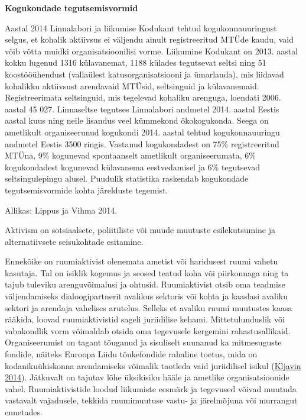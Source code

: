\documentclass[estonian,]{article}
\begin{document}
\begin{casebox}
\textbf{Kogukondade tegutsemisvormid}

Aastal 2014 Linnalabori ja liikumise Kodukant tehtud kogukonnauuringust
selgus, et kohalik aktiivsus ei väljendu ainult registreeritud MTÜde
kaudu, vaid võib võtta muidki organisatsioonilisi vorme. Liikumine
Kodukant on 2013. aastal kokku lugenud 1316 külavanemat, 1188 külades
tegutsevat seltsi ning 51 koostööühendust (vallaülest
katusorganisatsiooni ja ümarlauda), mis liidavad kohalikku aktiivsust
arendavaid MTÜsid, seltsinguid ja külavanemaid. Registreerimata
seltsinguid, mis tegelevad kohaliku arenguga, loendati 2006. aastal 45
027. Linnaseltse tegutses Linnalabori andmetel 2014. aastal Eestis
aastal kuus ning neile lisandus veel kümmekond ökokogukonda. Seega on
ametlikult organiseerunud kogukondi 2014. aastal tehtud kogukonnauuringu
andmetel Eestis 3500 ringis. Vastanud kogukondadest on 75\%
registreeritud MTÜna, 9\% kogunevad spontaanselt ametlikult
organiseerumata, 6\% kogukondadest kogunevad külavanema eestvedamisel ja
6\% tegutsevad seltsingulepingu alusel. Puudulik statistika raskendab
kogukondade tegutsemisvormide kohta järelduste tegemist.
\end{casebox}
\begin{imgsource}
{Allikas:} Lippus ja Vihma 2014.
\end{imgsource}

\begin{blockquote-right}
Aktivism on sotsiaalsete, poliitiliste või muude muutuste esilekutsumine
ja alternatiivsete seisukohtade esitamine.
\end{blockquote-right}

Ennekõike on ruumiaktivist olenemata ametist või haridusest ruumi vahetu kasutaja. Tal on isiklik kogemus ja seosed teatud koha või piirkonnaga ning ta tajub tuleviku arenguvõimalusi ja ohtusid. Ruumiaktivist otsib oma teadmise väljendamiseks dialoogipartnerit avalikus sektoris või kohta ja kaaslasi avaliku sektori ja arendaja vahelises arutelus. Selleks et avaliku ruumi muutustes kaasa rääkida, loovad ruumiaktivistid sageli juriidilise kehami. Mittetulunduslik või vabakondlik vorm võimaldab otsida oma tegevusele kergemini rahastusallikaid. Organiseerumist on tagant tõuganud ja sisuliselt suunanud ka mitmesuguste fondide, näiteks Euroopa Liidu tõukefondide rahaline toetus, mida on kodanikuühiskonna arendamiseks võimalik taotleda vaid juriidilisel isikul (\protect\hyperlink{Kljavin2014}{Kljavin 2014}). Jätkuvalt on tajutav lõhe üksikisiku hääle ja ametlike organisatsioonide vahel. Ruumiaktivistide loodud liikumiste eesmärk ja tegevused võivad muutuda vastavalt vajadusele, tekkida ruumimuutuse vastu- ja järelmõjuna või murrangut ennetades.
\end{document}
